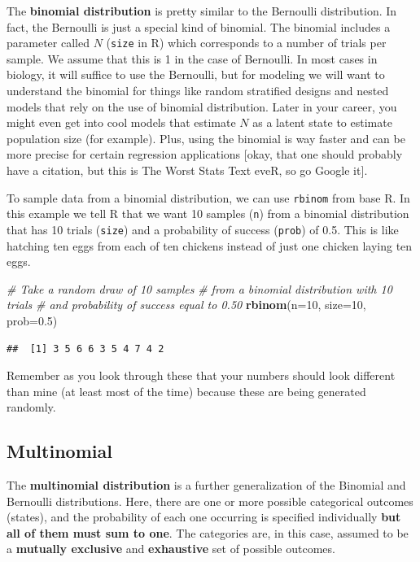 \documentclass[
]{book}
\newenvironment{Shaded}{\begin{snugshade}}{\end{snugshade}}
\newcommand{\CommentTok}[1]{\textcolor[rgb]{0.56,0.35,0.01}{\textit{#1}}}
\newcommand{\DataTypeTok}[1]{\textcolor[rgb]{0.13,0.29,0.53}{#1}}
\newcommand{\DecValTok}[1]{\textcolor[rgb]{0.00,0.00,0.81}{#1}}
\newcommand{\FloatTok}[1]{\textcolor[rgb]{0.00,0.00,0.81}{#1}}
\newcommand{\KeywordTok}[1]{\textcolor[rgb]{0.13,0.29,0.53}{\textbf{#1}}}
\newcommand{\NormalTok}[1]{#1}
\begin{document}
The \textbf{binomial distribution} is pretty similar to the Bernoulli distribution. In fact, the Bernoulli is just a special kind of binomial. The binomial includes a parameter called \(N\) (\texttt{size} in R) which corresponds to a number of trials per sample. We assume that this is 1 in the case of Bernoulli. In most cases in biology, it will suffice to use the Bernoulli, but for modeling we will want to understand the binomial for things like random stratified designs and nested models that rely on the use of binomial distribution. Later in your career, you might even get into cool models that estimate \(N\) as a latent state to estimate population size (for example). Plus, using the binomial is way faster and can be more precise for certain regression applications {[}okay, that one should probably have a citation, but this is The Worst Stats Text eveR, so go Google it{]}.

To sample data from a binomial distribution, we can use \texttt{rbinom} from base R. In this example we tell R that we want 10 samples (\texttt{n}) from a binomial distribution that has 10 trials (\texttt{size}) and a probability of success (\texttt{prob}) of 0.5. This is like hatching ten eggs from each of ten chickens instead of just one chicken laying ten eggs.

\begin{Shaded}
\begin{Highlighting}[]
\CommentTok{# Take a random draw of 10 samples}
\CommentTok{# from a binomial distribution with 10 trials}
\CommentTok{# and probability of success equal to 0.50}
\KeywordTok{rbinom}\NormalTok{(}\DataTypeTok{n=}\DecValTok{10}\NormalTok{, }\DataTypeTok{size=}\DecValTok{10}\NormalTok{, }\DataTypeTok{prob=}\FloatTok{0.5}\NormalTok{)}
\end{Highlighting}
\end{Shaded}

\begin{verbatim}
##  [1] 3 5 6 6 3 5 4 7 4 2
\end{verbatim}

Remember as you look through these that your numbers should look different than mine (at least most of the time) because these are being generated randomly.

\hypertarget{multinomial}{%
\subsection{Multinomial}\label{multinomial}}

The \textbf{multinomial distribution} is a further generalization of the Binomial and Bernoulli distributions. Here, there are one or more possible categorical outcomes (states), and the probability of each one occurring is specified individually \textbf{but all of them must sum to one}. The categories are, in this case, assumed to be a \textbf{mutually exclusive} and \textbf{exhaustive} set of possible outcomes.
\end{document}
